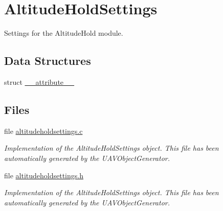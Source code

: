 \hypertarget{group___altitude_hold_settings}{\section{\-Altitude\-Hold\-Settings}
\label{group___altitude_hold_settings}
}


\-Settings for the \-Altitude\-Hold module.  


\subsection*{\-Data \-Structures}
\begin{DoxyCompactItemize}
\item 
struct \hyperlink{struct____attribute____}{\-\_\-\-\_\-attribute\-\_\-\-\_\-}
\end{DoxyCompactItemize}
\subsection*{\-Files}
\begin{DoxyCompactItemize}
\item 
file \hyperlink{altitudeholdsettings_8c}{altitudeholdsettings.\-c}
\begin{DoxyCompactList}\small\item\em \-Implementation of the \-Altitude\-Hold\-Settings object. \-This file has been automatically generated by the \-U\-A\-V\-Object\-Generator. \end{DoxyCompactList}\item 
file \hyperlink{altitudeholdsettings_8h}{altitudeholdsettings.\-h}
\begin{DoxyCompactList}\small\item\em \-Implementation of the \-Altitude\-Hold\-Settings object. \-This file has been automatically generated by the \-U\-A\-V\-Object\-Generator. \end{DoxyCompactList}\end{DoxyCompactItemize}
